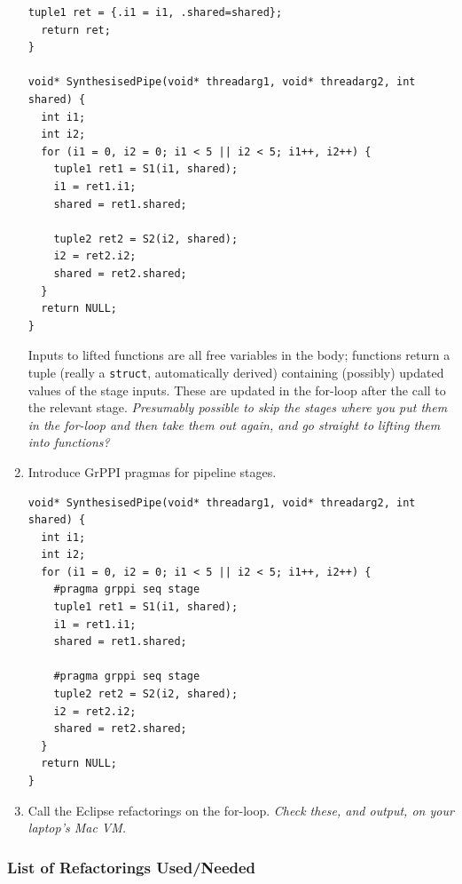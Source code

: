 \begin{enumerate}
\begin{lstlisting}[frame=single]
  tuple1 ret = {.i1 = i1, .shared=shared};
  return ret;
}

void* SynthesisedPipe(void* threadarg1, void* threadarg2, int shared) {
  int i1;
  int i2;
  for (i1 = 0, i2 = 0; i1 < 5 || i2 < 5; i1++, i2++) {
    tuple1 ret1 = S1(i1, shared);
    i1 = ret1.i1;
    shared = ret1.shared;
   
    tuple2 ret2 = S2(i2, shared);
    i2 = ret2.i2;
    shared = ret2.shared;
  }
  return NULL;
}
\end{lstlisting}
Inputs to lifted functions are all free variables in the body; functions return a tuple (really a \lstinline|struct|, automatically derived) containing (possibly) updated values of the stage inputs. These are updated in the for-loop after the call to the relevant stage. \emph{Presumably possible to skip the stages where you put them in the for-loop and then take  them out again, and go straight to lifting them into functions?}

\item Introduce GrPPI pragmas for pipeline stages.
\begin{lstlisting}[frame=single]
void* SynthesisedPipe(void* threadarg1, void* threadarg2, int shared) {
  int i1;
  int i2;
  for (i1 = 0, i2 = 0; i1 < 5 || i2 < 5; i1++, i2++) {
    #pragma grppi seq stage
    tuple1 ret1 = S1(i1, shared);
    i1 = ret1.i1;
    shared = ret1.shared;
   
    #pragma grppi seq stage
    tuple2 ret2 = S2(i2, shared);
    i2 = ret2.i2;
    shared = ret2.shared;
  }
  return NULL;
}
\end{lstlisting}

\item Call the Eclipse refactorings on the for-loop. \emph{Check these, and output, on your laptop's Mac VM.}
\end{enumerate}

\subsubsection{List of Refactorings Used/Needed}

